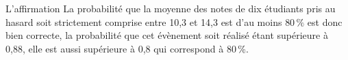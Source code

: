 \begin{enumerate}
\begin{enumerate}
		L'affirmation \og La probabilité que la moyenne des notes de dix étudiants pris au hasard soit strictement comprise entre 10,3 et 14,3 est d'au moins $80\,\%$ \fg{} est donc bien correcte, la probabilité que cet évènement soit réalisé étant supérieure à 0,88, elle est aussi supérieure à 0,8 qui correspond à 80\,\%.
	\end{enumerate}
\end{enumerate}

\medskip
